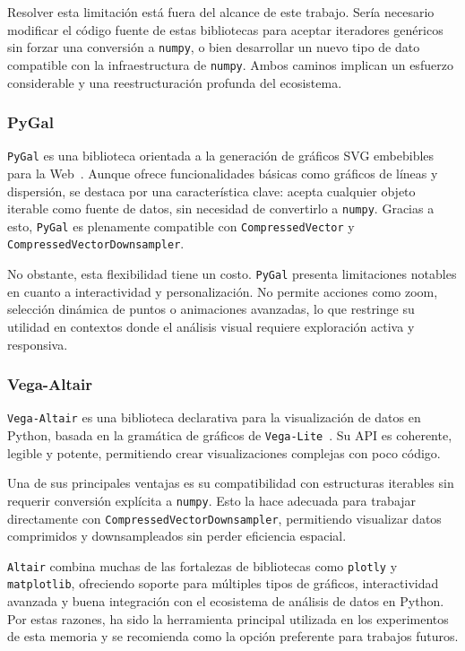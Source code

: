 Resolver esta limitación está fuera del alcance de este trabajo. Sería necesario modificar el código fuente de estas bibliotecas para aceptar iteradores genéricos sin forzar una conversión a \texttt{numpy}, o bien desarrollar un nuevo tipo de dato compatible con la infraestructura de \texttt{numpy}. Ambos caminos implican un esfuerzo considerable y una reestructuración profunda del ecosistema.

\subsubsection{PyGal}

\texttt{PyGal} es una biblioteca orientada a la generación de gráficos SVG embebibles para la Web~\cite{pygal}. Aunque ofrece funcionalidades básicas como gráficos de líneas y dispersión, se destaca por una característica clave: acepta cualquier objeto iterable como fuente de datos, sin necesidad de convertirlo a \texttt{numpy}. Gracias a esto, \texttt{PyGal} es plenamente compatible con \texttt{CompressedVector} y \texttt{CompressedVectorDownsampler}.

No obstante, esta flexibilidad tiene un costo. \texttt{PyGal} presenta limitaciones notables en cuanto a interactividad y personalización. No permite acciones como zoom, selección dinámica de puntos o animaciones avanzadas, lo que restringe su utilidad en contextos donde el análisis visual requiere exploración activa y responsiva.

\subsubsection{Vega-Altair}

\texttt{Vega-Altair} es una biblioteca declarativa para la visualización de datos en Python, basada en la gramática de gráficos de \texttt{Vega-Lite}~\cite{altair}. Su API es coherente, legible y potente, permitiendo crear visualizaciones complejas con poco código.

Una de sus principales ventajas es su compatibilidad con estructuras iterables sin requerir conversión explícita a \texttt{numpy}. Esto la hace adecuada para trabajar directamente con \texttt{CompressedVectorDownsampler}, permitiendo visualizar datos comprimidos y downsampleados sin perder eficiencia espacial.

\texttt{Altair} combina muchas de las fortalezas de bibliotecas como \texttt{plotly} y \texttt{matplotlib}, ofreciendo soporte para múltiples tipos de gráficos, interactividad avanzada y buena integración con el ecosistema de análisis de datos en Python. Por estas razones, ha sido la herramienta principal utilizada en los experimentos de esta memoria y se recomienda como la opción preferente para trabajos futuros.


